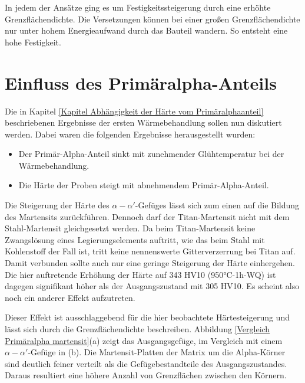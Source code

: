 \documentclass[a4paper, 11pt]{tubsreprt}
\begin{document}
In jedem der Ansätze ging es um Festigkeitssteigerung durch eine erhöhte Grenzflächendichte. Die Versetzungen können bei einer großen Grenzflächendichte nur unter hohem Energieaufwand durch das Bauteil wandern. So entsteht eine hohe Festigkeit.
\section{Einfluss des Primäralpha-Anteils}\label{Kapitel einfluss des Primäralphaanteils}
Die in Kapitel \ref{Kapitel Abhängigkeit der Härte vom Primäralphaanteil} beschriebenen Ergebnisse der ersten Wärmebehandlung sollen nun diskutiert werden. Dabei waren die folgenden Ergebnisse herausgestellt wurden:
\begin{itemize}
\item Der Primär-Alpha-Anteil sinkt mit zunehmender Glühtemperatur bei der Wärmebehandlung.
\item Die Härte der Proben steigt mit abnehmendem Primär-Alpha-Anteil.
\end{itemize}

Die Steigerung der Härte des $\alpha-\alpha'$-Gefüges lässt sich zum einen auf die Bildung des Martensits zurückführen. Dennoch darf der Titan-Martensit nicht mit dem Stahl-Martensit gleichgesetzt werden. Da beim Titan-Martensit keine Zwangslösung eines Legierungselements auftritt, wie das beim Stahl mit Kohlenstoff der Fall ist, tritt keine nennenswerte Gitterverzerrung bei Titan auf. Damit verbunden sollte auch nur eine geringe Steigerung der Härte einhergehen. Die hier auftretende Erhöhung der Härte auf 343 HV10 (950°C-1h-WQ) ist dagegen signifikant höher als der Ausgangszustand mit 305 HV10. Es scheint also noch ein anderer Effekt aufzutreten.

Dieser Effekt ist ausschlaggebend für die hier beobachtete Härtesteigerung und lässt sich durch die Grenzflächendichte beschreiben. Abbildung \ref{Vergleich Primäralpha martensit}(a) zeigt das Ausgangsgefüge, im Vergleich mit einem $\alpha-\alpha'$-Gefüge in (b). Die Martensit-Platten der Matrix um die Alpha-Körner sind deutlich feiner verteilt als die Gefügebestandteile des Ausgangszustandes. Daraus resultiert eine höhere Anzahl von  Grenzflächen zwischen den Körnern.
\end{document}
